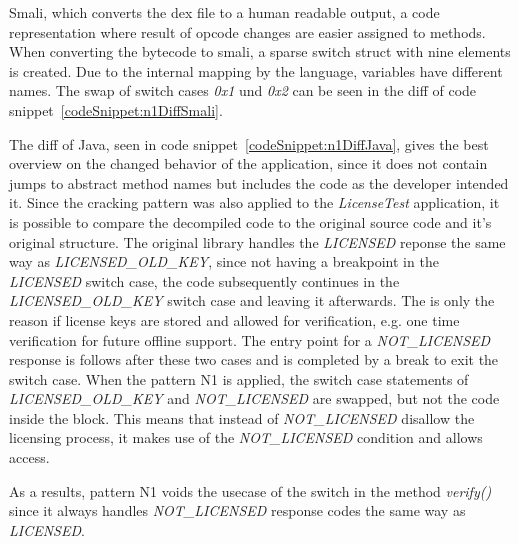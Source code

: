 Smali, which converts the \gls{dex} file to a human readable output, a code representation where result of opcode changes are easier assigned to methods.
When converting the bytecode to smali, a sparse switch struct with nine elements is created.
Due to the internal mapping by the language, variables have different names.
The swap of switch cases \textit{0x1} und \textit{0x2} can be seen in the diff of code snippet~\ref{codeSnippet:n1DiffSmali}.
\newline


The diff of Java, seen in code snippet~\ref{codeSnippet:n1DiffJava}, gives the best overview on the changed behavior of the application, since it does not contain jumps to abstract method names but includes the code as the developer intended it.
Since the cracking pattern was also applied to the \textit{LicenseTest}
 application, it is possible to compare the decompiled code to the original source code and it's original structure.
The original library handles the \textit{LICENSED} reponse the same way as \textit{LICENSED\_OLD\_KEY}, since not having a breakpoint in the \textit{LICENSED} switch case, the code subsequently continues in the \textit{LICENSED\_OLD\_KEY} switch case and leaving it afterwards.
The is only the reason if license keys are stored and allowed for verification, e.g. one time verification for future offline support.
The entry point for a \textit{NOT\_LICENSED} response is follows after these two cases and is completed by a break to exit the switch case.
When the pattern N1 is applied, the switch case statements of \textit{LICENSED\_OLD\_KEY} and \textit{NOT\_LICENSED} are swapped, but not the code inside the block.
This means that instead of \textit{NOT\_LICENSED} disallow the licensing process, it makes use of the \textit{NOT\_LICENSED} condition and allows access.
\newline


As a results, pattern N1 voids the usecase of the switch in the method \textit{verify()} since it always handles \textit{NOT\_LICENSED} response codes the same way as \textit{LICENSED}.


